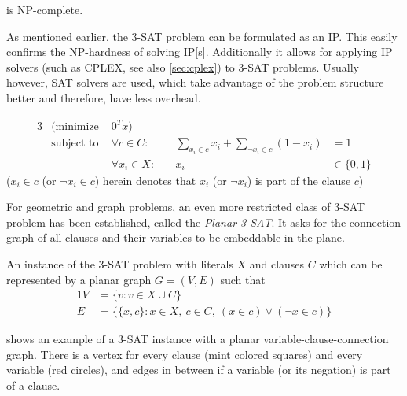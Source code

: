 \begin{theorem}
   is NP-complete.~\cite[Satisfiability with at most %
  3 Literals per Clause]{karp_np_complete}
\end{theorem}

As mentioned earlier, the 3-SAT problem can be formulated as
an \gls{IP}. This easily confirms the NP-hardness of solving
\gls{IP}[s]. Additionally it allows for applying \gls{IP} solvers 
(such as CPLEX, see also \cref{sec:cplex}) to 3-SAT problems. Usually
however, SAT solvers are used, which take advantage of the problem
structure better and therefore, have less overhead.

\begin{problem}
  \begin{alignat*}{3}
    &(\text{minimize } & 0^Tx) \\
    &\text{subject to } & \forall c \in C : &~
    & \sum\limits_{x_i \in c} x_i + \sum\limits_{\lnot x_i \in c} (1 - x_i) &= 1 \\
    && \forall x_i \in X : &~& x_i &\in \{0,1\}
  \end{alignat*}
  (\(x_i \in c\) (or \(\lnot x_i \in c\)) herein denotes that
  \(x_i\) (or \(\lnot x_i\)) is part of the clause \(c\))
\end{problem}

For geometric and graph problems, an even more restricted class of
3-SAT problem has been established, called the \emph{Planar 3-SAT}. It asks
for the connection graph of all clauses and their variables to be
embeddable in the plane.

\begin{problem}
  \label{prob:planar_3SAT}
  An instance of the 3-SAT problem with literals \(X\) and
  clauses \(C\) which can be represented by a planar graph
  \(G = (V,E)\) such that
  \begin{alignat*}{1}
    V &= \{v : v \in X \cup C\} \\
    E &= \{ \{x, c\} :
      x \in X,~
      c \in C,~
      (x \in c) \lor (\lnot x \in c)
    \}
  \end{alignat*}
\end{problem}

 shows an example of a 3-SAT instance
with a planar variable-clause-connection graph. There is a vertex for
every clause (mint colored squares) and every variable (red circles),
and edges in between if a variable (or its negation) is part of a
clause.

